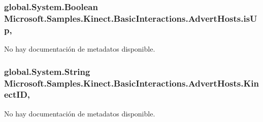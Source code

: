 \hypertarget{class_microsoft_1_1_samples_1_1_kinect_1_1_basic_interactions_1_1_advert_hosts_a6f03490cfb61306c9ff66d8f7708fce5}{
\subsubsection[{is\-Up}]{\setlength{\rightskip}{0pt plus 5cm}global.\-System.\-Boolean Microsoft.\-Samples.\-Kinect.\-Basic\-Interactions.\-Advert\-Hosts.\-is\-Up\hspace{0.3cm}{\ttfamily [get]}, {\ttfamily [set]}}}\label{class_microsoft_1_1_samples_1_1_kinect_1_1_basic_interactions_1_1_advert_hosts_a6f03490cfb61306c9ff66d8f7708fce5}


No hay documentación de metadatos disponible. 

\hypertarget{class_microsoft_1_1_samples_1_1_kinect_1_1_basic_interactions_1_1_advert_hosts_ae2965abfc1eb70e27b9fb09324148bfc}{
\subsubsection[{Kinect\-I\-D}]{\setlength{\rightskip}{0pt plus 5cm}global.\-System.\-String Microsoft.\-Samples.\-Kinect.\-Basic\-Interactions.\-Advert\-Hosts.\-Kinect\-I\-D\hspace{0.3cm}{\ttfamily [get]}, {\ttfamily [set]}}}\label{class_microsoft_1_1_samples_1_1_kinect_1_1_basic_interactions_1_1_advert_hosts_ae2965abfc1eb70e27b9fb09324148bfc}


No hay documentación de metadatos disponible. 

